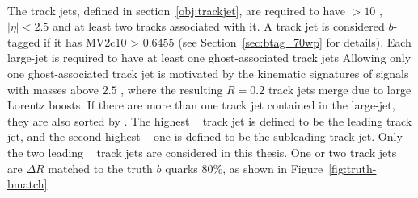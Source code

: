 \paragraph{}
The track jets, defined in section~\ref{obj:trackjet}, are required to have \pt $> 10$ \GeV, $|\eta| < 2.5$ and at least two tracks associated with it. 
A track jet is considered $b$-tagged if it has MV2c10 > $0.6455$ (see Section~\ref{sec:btag_70wp} for details).
Each large-\R jet is required to have at least one ghost-associated track jets
Allowing only one ghost-associated track jet is motivated by the kinematic signatures of signals with masses above $2.5$ \TeV, where the resulting $R = 0.2$ track jets merge due to large Lorentz boosts.
If there are more than one track jet contained in the large-\R jet, they are also sorted by \pt.
The highest \pt~ track jet is defined to be the leading track jet, and the second highest \pt~ one is defined to be the subleading track jet.
Only the two leading \pt~ track jets are considered in this thesis.
One or two track jets are $\Delta R$ matched to the truth $b$ quarks $80\%$, as shown in Figure~\ref{fig:truth-bmatch}.


